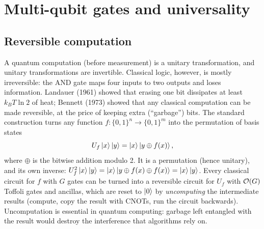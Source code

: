 \chapter{Multi-qubit gates and universality}\label{ch:gates}

\section{Reversible computation}\label{sec:reversible}
A quantum computation (before measurement) is a unitary transformation, and unitary transformations are invertible. Classical logic, however, is mostly irreversible:
the AND gate maps four inputs to two outputs and loses information. Landauer (1961) showed that erasing one bit dissipates at least $k_BT\ln2$ of heat; Bennett (1973) showed that
any classical computation can be made reversible, at the price of keeping extra (``garbage'') bits. The standard construction turns any function $f:\{0,1\}^n\to\{0,1\}^m$ into the
permutation of basis states
\begin{equation}\label{eq:Uf}
  U_f\left|x\right\rangle\left|y\right\rangle=\left|x\right\rangle\left|y\oplus f(x)\right\rangle,
\end{equation}
where $\oplus$ is the bitwise addition modulo 2. It is a permutation (hence unitary), and its own inverse: $U_f^2\left|x\right\rangle\left|y\right\rangle=\left|x\right\rangle\left|y\oplus f(x)\oplus f(x)\right\rangle=\left|x\right\rangle\left|y\right\rangle$.
Every classical circuit for $f$ with $G$ gates can be turned into a reversible circuit for $U_f$ with $\mathcal O(G)$ Toffoli gates and ancillas, which are reset to $\left|0\right\rangle$ by
\emph{uncomputing} the intermediate results (compute, copy the result with CNOTs, run the circuit backwards). Uncomputation is essential in quantum computing: garbage left
entangled with the result would destroy the interference that algorithms rely on.

